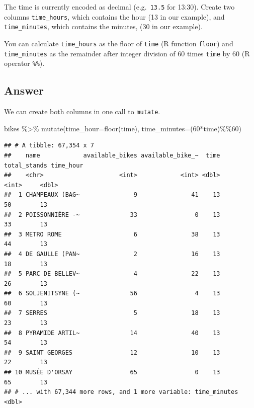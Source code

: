 \documentclass[
]{book}
\newenvironment{Shaded}{\begin{snugshade}}{\end{snugshade}}
\newcommand{\AttributeTok}[1]{\textcolor[rgb]{0.77,0.63,0.00}{#1}}
\newcommand{\DecValTok}[1]{\textcolor[rgb]{0.00,0.00,0.81}{#1}}
\newcommand{\FunctionTok}[1]{\textcolor[rgb]{0.00,0.00,0.00}{#1}}
\newcommand{\NormalTok}[1]{#1}
\newcommand{\SpecialCharTok}[1]{\textcolor[rgb]{0.00,0.00,0.00}{#1}}
\begin{document}
The time is currently encoded as decimal (e.g.~\texttt{13.5} for 13:30). Create two columns \texttt{time\_hours}, which contains the hour (13 in our example), and \texttt{time\_minutes}, which contains the minutes, (30 in our example).

You can calculate \texttt{time\_hours} as the floor of \texttt{time} (R function \texttt{floor}) and \texttt{time\_minutes} as the remainder after integer division of 60 times \texttt{time} by 60 (R operator \texttt{\%\%}).

\hypertarget{answer-3}{%
\subsection{Answer}\label{answer-3}}

We can create both columns in one call to \texttt{mutate}.

\begin{Shaded}
\begin{Highlighting}[]
\NormalTok{bikes }\SpecialCharTok{\%\textgreater{}\%}
  \FunctionTok{mutate}\NormalTok{(}\AttributeTok{time\_hour=}\FunctionTok{floor}\NormalTok{(time), }\AttributeTok{time\_minutes=}\NormalTok{(}\DecValTok{60}\SpecialCharTok{*}\NormalTok{time)}\SpecialCharTok{\%\%}\DecValTok{60}\NormalTok{)}
\end{Highlighting}
\end{Shaded}

\begin{verbatim}
## # A tibble: 67,354 x 7
##    name            available_bikes available_bike_~  time total_stands time_hour
##    <chr>                     <int>            <int> <dbl>        <int>     <dbl>
##  1 CHAMPEAUX (BAG~               9               41    13           50        13
##  2 POISSONNIÈRE -~              33                0    13           33        13
##  3 METRO ROME                    6               38    13           44        13
##  4 DE GAULLE (PAN~               2               16    13           18        13
##  5 PARC DE BELLEV~               4               22    13           26        13
##  6 SOLJENITSYNE (~              56                4    13           60        13
##  7 SERRES                        5               18    13           23        13
##  8 PYRAMIDE ARTIL~              14               40    13           54        13
##  9 SAINT GEORGES                12               10    13           22        13
## 10 MUSÉE D'ORSAY                65                0    13           65        13
## # ... with 67,344 more rows, and 1 more variable: time_minutes <dbl>
\end{verbatim}
\end{document}

